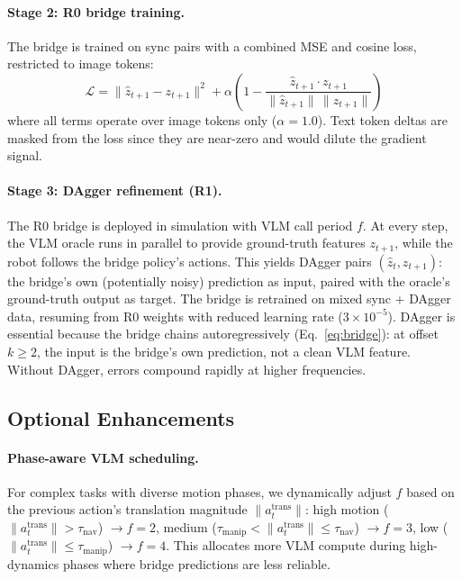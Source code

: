 \documentclass{article}
\begin{document}
\paragraph{Stage 2: R0 bridge training.}
The bridge is trained on sync pairs with a combined MSE and cosine loss, restricted to image tokens:
\begin{equation}
    \mathcal{L} = \| \hat{z}_{t+1} - z_{t+1} \|^2 + \alpha \left(1 - \frac{\hat{z}_{t+1} \cdot z_{t+1}}{\|\hat{z}_{t+1}\| \, \|z_{t+1}\|}\right)
    \label{eq:loss}
\end{equation}
where all terms operate over image tokens only ($\alpha = 1.0$).
Text token deltas are masked from the loss since they are near-zero and would dilute the gradient signal.

\paragraph{Stage 3: DAgger refinement (R1).}
The R0 bridge is deployed in simulation with VLM call period $f$.
At every step, the VLM oracle runs in parallel to provide ground-truth features $z_{t+1}$, while the robot follows the bridge policy's actions.
This yields DAgger pairs $(\hat{z}_t, z_{t+1})$: the bridge's own (potentially noisy) prediction as input, paired with the oracle's ground-truth output as target.
The bridge is retrained on mixed sync + DAgger data, resuming from R0 weights with reduced learning rate ($3 \times 10^{-5}$).
DAgger is essential because the bridge chains autoregressively (Eq.~\ref{eq:bridge}): at offset $k \geq 2$, the input is the bridge's own prediction, not a clean VLM feature.
Without DAgger, errors compound rapidly at higher frequencies.

\subsection{Optional Enhancements}

\paragraph{Phase-aware VLM scheduling.}
For complex tasks with diverse motion phases, we dynamically adjust $f$ based on the previous action's translation magnitude $\|a_{t}^{\text{trans}}\|$:
high motion ($\|a_{t}^{\text{trans}}\| > \tau_\text{nav}$) $\rightarrow f{=}2$,
medium ($\tau_\text{manip} < \|a_{t}^{\text{trans}}\| \leq \tau_\text{nav}$) $\rightarrow f{=}3$,
low ($\|a_{t}^{\text{trans}}\| \leq \tau_\text{manip}$) $\rightarrow f{=}4$.
This allocates more VLM compute during high-dynamics phases where bridge predictions are less reliable.
\end{document}
